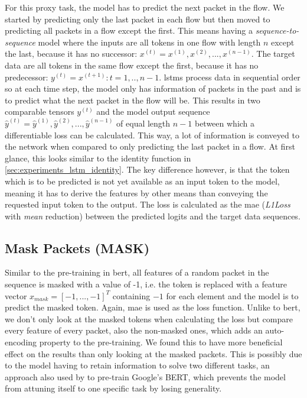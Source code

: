For this proxy task, the model has to predict the next packet in the flow. We started by predicting only the last packet in each flow but then moved to predicting all packets in a flow except the first. This means having a \textit{sequence-to-sequence} model where the inputs are all tokens in one flow with length $n$ except the last, because it has no successor: $x^{(t)} = x^{(1)}, x^{(2)}, ..., x^{(n-1)}$. The target data are all tokens in the same flow except the first, because it has no predecessor: $y^{(t)} = x^{(t+1)} : t = 1,..,n-1$. \glspl{lstm} process data in sequential order so at each time step, the model only has information of packets in the past and is to predict what the next packet in the flow will be. This results in two comparable tensors $y^{(t)}$ and the model output sequence $\hat{y}^{(t)} = \hat{y}^{(1)}, \hat{y}^{(2)}, ..., \hat{y}^{(n-1)}$ of equal length $n-1$ between which a differentiable loss can be calculated. This way, a lot of information is conveyed to the network when compared to only predicting the last packet in a flow. At first glance, this looks similar to the identity function in \ref{sec:experiments_lstm_identity}. The key difference however, is that the token which is to be predicted is not yet available as an input token to the model, meaning it has to derive the features by other means than conveying the requested input token to the output. The loss is calculated as the \gls{mae} (\textit{L1Loss} with \textit{mean} reduction) between the predicted logits and the target data sequences.

\subsection{Mask Packets (MASK)} \label{sec:experiments:lstm:mask_packet}

Similar to the pre-training in \gls{bert}, all features of a random packet in the sequence is masked with a value of -1, i.e. the token is replaced with a feature vector $x_{mask} = [-1, ..., -1]^T$ containing $-1$ for each element and the model is to predict the masked token. Again, \gls{mae} is used as the loss function. Unlike to \gls{bert}, we don't only look at the masked tokens when calculating the loss but compare every feature of every packet, also the non-masked ones, which adds an auto-encoding property to the pre-training. We found this to have more beneficial effect on the results than only looking at the masked packets. This is possibly due to the model having to retain information to solve two different tasks, an approach also used by to pre-train Google's BERT,  which prevents the model from attuning itself to one specific task by losing generality.

